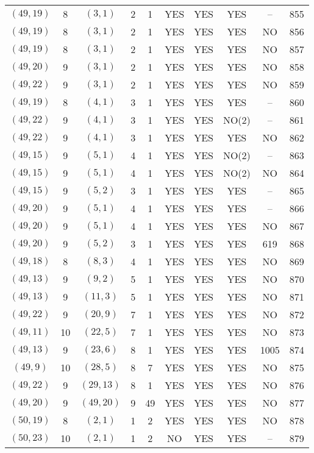 \begin{longtable}{|c|c|c|c|c|c|c|c|c|c|}
$(49, 19)$ & 8 & $(3, 1)$ & 2 & 1 & YES & YES & YES & -- & 855\\
$(49, 19)$ & 8 & $(3, 1)$ & 2 & 1 & YES & YES & YES & NO & 856\\
$(49, 19)$ & 8 & $(3, 1)$ & 2 & 1 & YES & YES & YES & NO & 857\\
$(49, 20)$ & 9 & $(3, 1)$ & 2 & 1 & YES & YES & YES & NO & 858\\
$(49, 22)$ & 9 & $(3, 1)$ & 2 & 1 & YES & YES & YES & NO & 859\\
$(49, 19)$ & 8 & $(4, 1)$ & 3 & 1 & YES & YES & YES & -- & 860\\
$(49, 22)$ & 9 & $(4, 1)$ & 3 & 1 & YES & YES & NO(2) & -- & 861\\
$(49, 22)$ & 9 & $(4, 1)$ & 3 & 1 & YES & YES & YES & NO & 862\\
$(49, 15)$ & 9 & $(5, 1)$ & 4 & 1 & YES & YES & NO(2) & -- & 863\\
$(49, 15)$ & 9 & $(5, 1)$ & 4 & 1 & YES & YES & NO(2) & NO & 864\\
$(49, 15)$ & 9 & $(5, 2)$ & 3 & 1 & YES & YES & YES & -- & 865\\
$(49, 20)$ & 9 & $(5, 1)$ & 4 & 1 & YES & YES & YES & -- & 866\\
$(49, 20)$ & 9 & $(5, 1)$ & 4 & 1 & YES & YES & YES & NO & 867\\
$(49, 20)$ & 9 & $(5, 2)$ & 3 & 1 & YES & YES & YES & 619 & 868\\
$(49, 18)$ & 8 & $(8, 3)$ & 4 & 1 & YES & YES & YES & NO & 869\\
$(49, 13)$ & 9 & $(9, 2)$ & 5 & 1 & YES & YES & YES & NO & 870\\
$(49, 13)$ & 9 & $(11, 3)$ & 5 & 1 & YES & YES & YES & NO & 871\\
$(49, 22)$ & 9 & $(20, 9)$ & 7 & 1 & YES & YES & YES & NO & 872\\
$(49, 11)$ & 10 & $(22, 5)$ & 7 & 1 & YES & YES & YES & NO & 873\\
$(49, 13)$ & 9 & $(23, 6)$ & 8 & 1 & YES & YES & YES & 1005 & 874\\
$(49, 9)$ & 10 & $(28, 5)$ & 8 & 7 & YES & YES & YES & NO & 875\\
$(49, 22)$ & 9 & $(29, 13)$ & 8 & 1 & YES & YES & YES & NO & 876\\
$(49, 20)$ & 9 & $(49, 20)$ & 9 & 49 & YES & YES & YES & NO & 877\\
$(50, 19)$ & 8 & $(2, 1)$ & 1 & 2 & YES & YES & YES & NO & 878\\
$(50, 23)$ & 10 & $(2, 1)$ & 1 & 2 & NO & YES & YES & -- & 879\\

\end{longtable}
